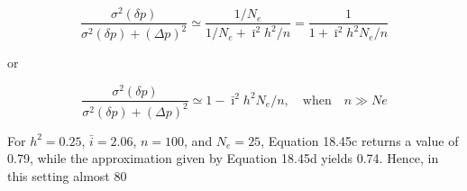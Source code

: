 \documentclass{article}
\begin{document}
\begin{equation}
\frac{\sigma^{2}(\delta p)}{\sigma^{2}(\delta p)+(\Delta p)^{2}}\simeq\frac{1/N_{e}}{1/N_{e}+\bar{\imath}^{2}h^{2}/n}=\frac{1}{1+\bar{\imath}^{2}h^{2}N_{e}/n}
\tag{18.45c}
\label{eq:18_45c}
\end{equation}

or

\begin{equation}
\frac{\sigma^{2}(\delta p)}{\sigma^{2}(\delta p)+(\Delta p)^{2}}\simeq1-\bar{\imath}^{2}h^{2}N_{e}/n,\quad\mathrm{w h e n}\quad n\gg N e
\tag{18.45d}
\label{eq:18_45d}
\end{equation}

For  $ h^2 = 0.25 $,  $ \bar{i} = 2.06 $,  $ n = 100 $, and  $ N_e = 25 $, Equation 18.45c returns a value of 0.79, while the approximation given by Equation 18.45d yields 0.74. Hence, in this setting almost 80%
\end{document}
